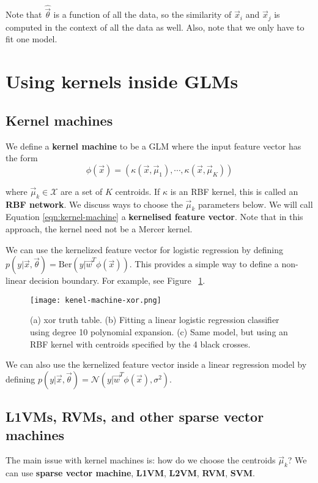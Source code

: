 Note that $\hat{\vec{\theta}}$ is a function of all the data, so the similarity of $\vec{x}_i$ and $\vec{x}_j$ is computed in the context of all the data as well. Also, note that we only have to fit one model.


\section{Using kernels inside GLMs}


\subsection{Kernel machines}
We define a \textbf{kernel machine} to be a GLM where the input feature vector has the form
\begin{equation}\label{eqn:kernel-machine}
\phi(\vec{x})=(\kappa(\vec{x},\vec{\mu}_1),\cdots,\kappa(\vec{x},\vec{\mu}_K))
\end{equation}

where $\vec{\mu}_k \in \mathcal{X}$ are a set of $K$ centroids. If $\kappa$ is an RBF kernel, this is called an \textbf{RBF network}. We discuss ways to choose the $\vec{\mu}_k$ parameters below. We will call Equation \eqref{eqn:kernel-machine} a \textbf{kernelised feature vector}. Note that in this approach, the kernel need not be a Mercer kernel.

We can use the kernelized feature vector for logistic regression by defining $p(y|\vec{x},\vec{\theta})=\mathrm{Ber}(y|\vec{w}^T\phi(\vec{x}))$. This provides a simple way to define a non-linear decision boundary. For example, see Figure ~\ref{fig:kenel-machine-xor}.

\begin{figure}[hbtp]
\centering
    \texttt{[image: kenel-machine-xor.png]}
\caption{(a) xor truth table. (b) Fitting a linear logistic regression classifier using degree 10 polynomial expansion. (c) Same model, but using an RBF kernel with centroids specified by the 4 black crosses.}
\label{fig:kenel-machine-xor} 
\end{figure}

We can also use the kernelized feature vector inside a linear regression model by defining $p(y|\vec{x},\vec{\theta})=\mathcal{N}(y|\vec{w}^T\phi(\vec{x}),\sigma^2)$. 


\subsection{L1VMs, RVMs, and other sparse vector machines}
\label{sec:sparse-kernel-machines}
The main issue with kernel machines is: how do we choose the centroids $\vec{\mu}_k$? We can use \textbf{sparse vector machine}, \textbf{L1VM}, \textbf{L2VM}, \textbf{RVM}, \textbf{SVM}.

